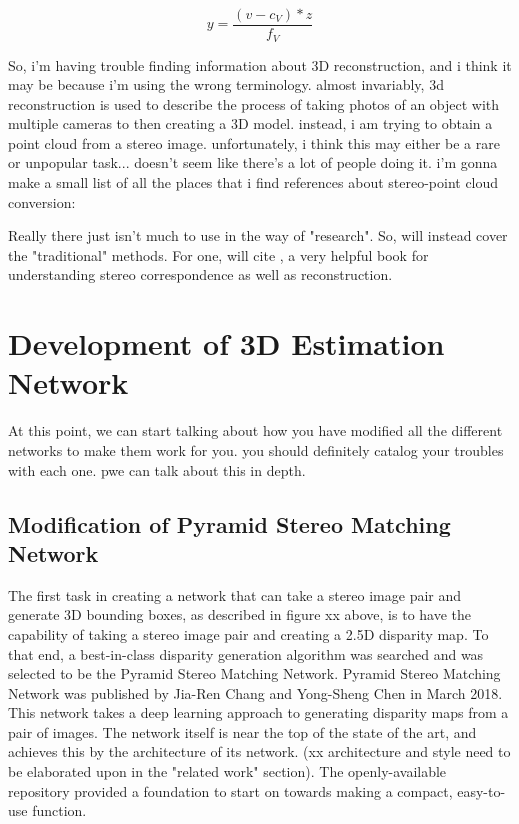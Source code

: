 \begin{equation}
y = \frac{(v - c_V) * z}{f_V}
\end{equation}



So, i'm having trouble finding information about 3D reconstruction, and i think it may be because i'm using the wrong terminology. almost invariably, 3d reconstruction is used to describe the process of taking photos of an object with multiple cameras to then creating a 3D model. instead, i am trying to obtain a point cloud from a stereo image. unfortunately, i think this may either be a rare or unpopular task... doesn't seem like there's a lot of people doing it. i'm gonna make a small list of all the places that i find references about stereo-point cloud conversion: 

Really there just isn't much to use in the way of "research". So, will instead cover the "traditional" methods. For one, will cite \cite{szeliski_computer_2010}, a very helpful book for understanding stereo correspondence as well as reconstruction.






\section{Development of 3D Estimation Network}
At this point, we can start talking about how you have modified all the different networks to make them work for you. you should definitely catalog your troubles with each one. pwe can talk about this in depth. 

\subsection{Modification of Pyramid Stereo Matching Network}
The first task in creating a network that can take a stereo image pair and generate 3D bounding boxes, as described in figure xx above, is to have the capability of taking a stereo image pair and creating a 2.5D disparity map. To that end, a best-in-class disparity generation algorithm was searched and was selected to be the Pyramid Stereo Matching Network. Pyramid Stereo Matching Network was published by Jia-Ren Chang and Yong-Sheng Chen in March 2018. This network takes a deep learning approach to generating disparity maps from a pair of images. The network itself is near the top of the state of the art, and achieves this by the architecture of its network. (xx architecture and style need to be elaborated upon in the "related work" section). The openly-available repository provided a foundation to start on towards making a compact, easy-to-use function. 


